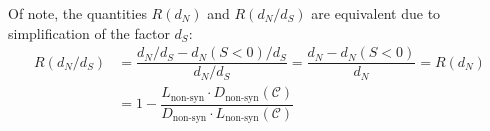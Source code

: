 \documentclass{article}
\newcommand{\dn}{d_N}
\newcommand{\ds}{d_S}
\newcommand{\dnds}{\dn / \ds}
\newcommand{\Sphy}{S}
\newcommand{\Sphyclass}{\mathcal{C}}
\begin{document}
    Of note, the quantities $R(\dn)$ and $R(\dnds)$ are equivalent due to simplification of the factor $\ds$:
    \begin{align}
        R(\dnds) &= \dfrac{\dnds - \dn(\Sphy < 0) / \ds}{\dnds} = \dfrac{\dn - \dn(\Sphy < 0)}{\dn} = R(\dn) \\
        &= 1 - \dfrac{ L_{\textrm{non-syn}} \cdot D_{\textrm{non-syn}}\left( \Sphyclass \right) }{ D_{\textrm{non-syn}} \cdot L_{\textrm{non-syn}} \left( \Sphyclass \right)}
    \end{align}

    \printbibliography
\end{document}
